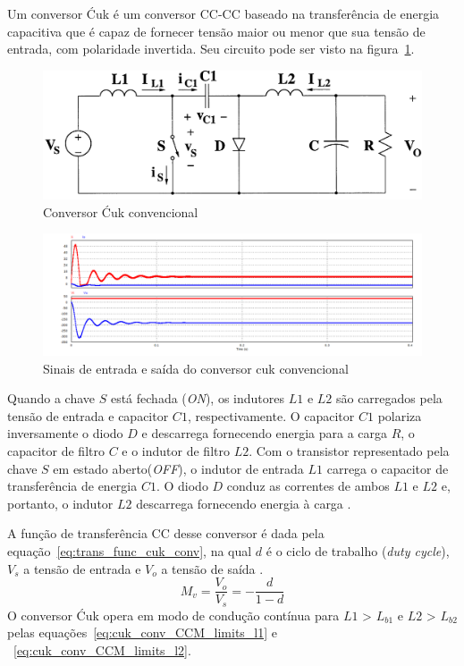 \documentclass[
	12pt,				%
	openany,
	onseside,
	a4paper,			%
	english,			%
	french,				%
	spanish,			%
	brazil,				%
	]{abntex2}
\begin{document}
Um conversor Ćuk é um conversor CC-CC baseado na transferência de energia capacitiva que é capaz de fornecer tensão maior ou menor que sua tensão de entrada, com polaridade invertida. Seu circuito pode ser visto na figura~\ref{fig:conv_cuk_circuit}. 

\begin{figure}[htbp]
	\centering
		\includegraphics[width=0.55 \linewidth]{conv_cuk_circuit}
		\caption{Conversor Ćuk convencional \cite{RASHID_CUK}}
		\label{fig:conv_cuk_circuit}
\end{figure}

\begin{figure}[htbp]
	\centering
		\includegraphics[width= \linewidth]{cuk_conv_In_Out}
		\caption{Sinais de entrada  e saída do conversor cuk convencional}
		\label{fig:conv_cuk_In_Out}
\end{figure}

Quando a chave $S$ está fechada (\textit{ON}), os indutores $L1$ e $L2$ são carregados pela tensão de entrada e capacitor $C1$, respectivamente. O capacitor $C1$ polariza inversamente o diodo $D$ e descarrega fornecendo energia para a carga $R$, o capacitor de filtro $C$ e o indutor de filtro $L2$.
Com o transistor representado pela chave $S$ em estado aberto(\textit{OFF}), o indutor de entrada $L1$ carrega o capacitor de transferência de energia $C1$. O diodo $D$ conduz as correntes de ambos $L1$ e $L2$ e, portanto, o indutor $L2$ descarrega fornecendo energia à carga \cite{RASHID_CUK} \cite{JOSEPH_2015_Intervealed_CUK}. 

A função de transferência CC desse conversor é dada pela equação~\ref{eq:trans_func_cuk_conv}, na qual $d$ é o ciclo de trabalho (\textit{duty cycle}), $V_s$ a tensão de entrada e $V_o$ a tensão de saída \cite{RASHID_CUK} \cite{JOSEPH_2018_Intervelead_cuk}.
\begin{equation}
	M_v = \frac{V_o}{V_s}= - \frac{d}{1-d}
	\label{eq:trans_func_cuk_conv}
\end{equation}
O conversor Ćuk opera em modo de condução contínua para $L1$ > $L_{b1}$ e $L2$ > $L_{b2}$ pelas equações~\ref{eq:cuk_conv_CCM_limits_l1} e ~\ref{eq:cuk_conv_CCM_limits_l2}.
\end{document}
